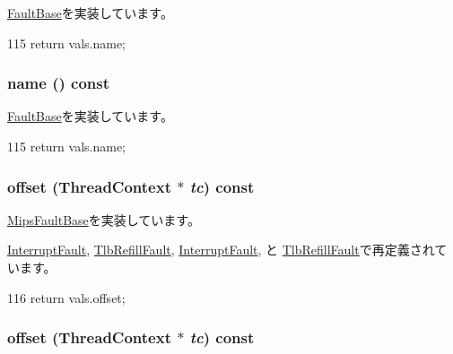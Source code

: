 \hyperlink{classFaultBase_aad960357563b8b969d2dffdcc6861de7}{FaultBase}を実装しています。


\begin{DoxyCode}
115 { return vals.name; }
\end{DoxyCode}
\hypertarget{classMipsISA_1_1MipsFault_a73adb23259baf912a81683a9790a303f}{
\subsubsection[{name}]{ name () const}}
\label{classMipsISA_1_1MipsFault_a73adb23259baf912a81683a9790a303f}


\hyperlink{classFaultBase_aad960357563b8b969d2dffdcc6861de7}{FaultBase}を実装しています。


\begin{DoxyCode}
115 { return vals.name; }
\end{DoxyCode}
\hypertarget{classMipsISA_1_1MipsFault_a9c059b781f653170e9da1d520c6d96b1}{
\subsubsection[{offset}]{ offset ({\bf ThreadContext} $\ast$ {\em tc}) const}}
\label{classMipsISA_1_1MipsFault_a9c059b781f653170e9da1d520c6d96b1}


\hyperlink{classMipsISA_1_1MipsFaultBase_abc58e13990620c35409a5eaf15679c3c}{MipsFaultBase}を実装しています。

\hyperlink{classMipsISA_1_1InterruptFault_a9c059b781f653170e9da1d520c6d96b1}{InterruptFault}, \hyperlink{classMipsISA_1_1TlbRefillFault_a9c059b781f653170e9da1d520c6d96b1}{TlbRefillFault}, \hyperlink{classMipsISA_1_1InterruptFault_a9c059b781f653170e9da1d520c6d96b1}{InterruptFault}, と \hyperlink{classMipsISA_1_1TlbRefillFault_a9c059b781f653170e9da1d520c6d96b1}{TlbRefillFault}で再定義されています。


\begin{DoxyCode}
116 { return vals.offset; }
\end{DoxyCode}
\hypertarget{classMipsISA_1_1MipsFault_a9c059b781f653170e9da1d520c6d96b1}{
\subsubsection[{offset}]{ offset ({\bf ThreadContext} $\ast$ {\em tc}) const}}
\label{classMipsISA_1_1MipsFault_a9c059b781f653170e9da1d520c6d96b1}


